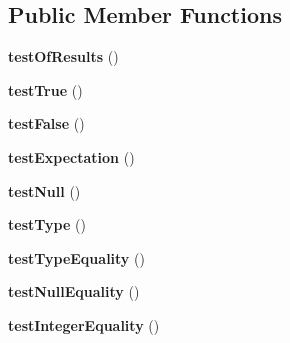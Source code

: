 \subsection*{Public Member Functions}
\begin{DoxyCompactItemize}
\item 
\hypertarget{class_failing_unit_test_case_output_ae4453e639dd7099e22cce8416a0a89e8}{
{\bfseries testOfResults} ()}
\label{class_failing_unit_test_case_output_ae4453e639dd7099e22cce8416a0a89e8}

\item 
\hypertarget{class_failing_unit_test_case_output_a00ddecc2fa1b8735fb0997a8c3ff5b1f}{
{\bfseries testTrue} ()}
\label{class_failing_unit_test_case_output_a00ddecc2fa1b8735fb0997a8c3ff5b1f}

\item 
\hypertarget{class_failing_unit_test_case_output_a430e10a11b5767e60bd481318a62e028}{
{\bfseries testFalse} ()}
\label{class_failing_unit_test_case_output_a430e10a11b5767e60bd481318a62e028}

\item 
\hypertarget{class_failing_unit_test_case_output_a7e7224b599f13b69ac6f009d410d4d86}{
{\bfseries testExpectation} ()}
\label{class_failing_unit_test_case_output_a7e7224b599f13b69ac6f009d410d4d86}

\item 
\hypertarget{class_failing_unit_test_case_output_ab6b328759b0498f0c7984669381d5193}{
{\bfseries testNull} ()}
\label{class_failing_unit_test_case_output_ab6b328759b0498f0c7984669381d5193}

\item 
\hypertarget{class_failing_unit_test_case_output_aa5123bd67e455a8c4cf001fb13a08925}{
{\bfseries testType} ()}
\label{class_failing_unit_test_case_output_aa5123bd67e455a8c4cf001fb13a08925}

\item 
\hypertarget{class_failing_unit_test_case_output_a028d7abab3847b370ac9e723e89b1251}{
{\bfseries testTypeEquality} ()}
\label{class_failing_unit_test_case_output_a028d7abab3847b370ac9e723e89b1251}

\item 
\hypertarget{class_failing_unit_test_case_output_a9440401502e7de06985d335f43c28fe8}{
{\bfseries testNullEquality} ()}
\label{class_failing_unit_test_case_output_a9440401502e7de06985d335f43c28fe8}

\item 
\hypertarget{class_failing_unit_test_case_output_ac85e1335444b6cf8394e4f13f5ac0fae}{
{\bfseries testIntegerEquality} ()}
\label{class_failing_unit_test_case_output_ac85e1335444b6cf8394e4f13f5ac0fae}


\end{DoxyCompactItemize}
